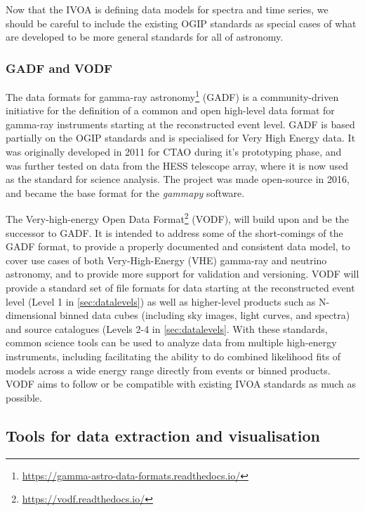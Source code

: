 \documentclass[11pt,a4paper]{ivoa}
\begin{document}
Now that the IVOA is defining data models for spectra and time series, we should be careful to include the existing OGIP standards as special cases of what are developed to be more general standards for all of astronomy.


\subsubsection{GADF and VODF}
\label{sec:GADF}

The data formats for gamma-ray astronomy\footnote{\url{https://gamma-astro-data-formats.readthedocs.io/}} (GADF) is a community-driven initiative for the definition of a common and open high-level data format for gamma-ray instruments \citep{2017AIPC.1792g0006D,2021-DF} starting at the reconstructed event level. GADF is based partially on the OGIP standards and is specialised for Very High Energy data. It was originally developed in 2011 for CTAO during it's prototyping phase, and was further tested on data from the HESS telescope array, where it is now used as the standard for science analysis. The project was made open-source in 2016, and became the base format for the \emph{gammapy} software.

The Very-high-energy Open Data Format\footnote{\url{https://vodf.readthedocs.io/}} (VODF), will build upon and be the successor to GADF. It is intended to address some of the short-comings of the GADF format, to provide a properly documented and consistent data model, to cover use cases of both  Very-High-Energy (VHE) gamma-ray and neutrino astronomy, and to provide more support for validation and versioning. VODF will provide a standard set of file formats for data starting at the reconstructed event level (Level 1 in \autoref{sec:datalevels}) as well as higher-level products such as N-dimensional binned data cubes (including sky images, light curves, and spectra) and source catalogues (Levels 2-4 in \autoref{sec:datalevels}. With these standards, common science tools can be used to analyze data from multiple high-energy instruments, including facilitating the ability to do combined likelihood fits of models across a wide energy range directly from events or binned products. VODF aims to follow or be compatible with existing IVOA standards as much as possible.

\subsection{Tools for data extraction and visualisation}
\label{sec:tools}
\end{document}
